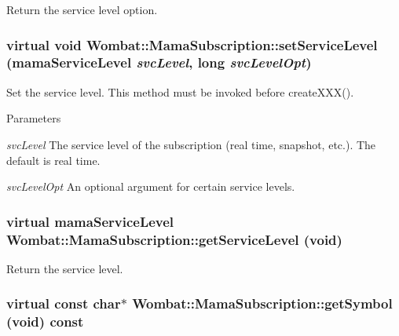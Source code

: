 Return the service level option. \hypertarget{classWombat_1_1MamaSubscription_a920036bab7805f4d13ea709343ae7260}{
\subsubsection[{setServiceLevel}]{\setlength{\rightskip}{0pt plus 5cm}virtual void Wombat::MamaSubscription::setServiceLevel (mamaServiceLevel {\em svcLevel}, \/  long {\em svcLevelOpt})}}
\label{classWombat_1_1MamaSubscription_a920036bab7805f4d13ea709343ae7260}


Set the service level. This method must be invoked before createXXX().


\begin{DoxyParams}{Parameters}
\item[{\em svcLevel}]The service level of the subscription (real time, snapshot, etc.). The default is real time. \item[{\em svcLevelOpt}]An optional argument for certain service levels. \end{DoxyParams}
\hypertarget{classWombat_1_1MamaSubscription_abed527205b1f055af3e591cd43eb13f8}{
\subsubsection[{getServiceLevel}]{\setlength{\rightskip}{0pt plus 5cm}virtual mamaServiceLevel Wombat::MamaSubscription::getServiceLevel (void)}}
\label{classWombat_1_1MamaSubscription_abed527205b1f055af3e591cd43eb13f8}


Return the service level. \hypertarget{classWombat_1_1MamaSubscription_adaf58e3a3a3aa0b66f9af9bb28b22564}{
\subsubsection[{getSymbol}]{\setlength{\rightskip}{0pt plus 5cm}virtual const char$\ast$ Wombat::MamaSubscription::getSymbol (void) const}}
\label{classWombat_1_1MamaSubscription_adaf58e3a3a3aa0b66f9af9bb28b22564}



